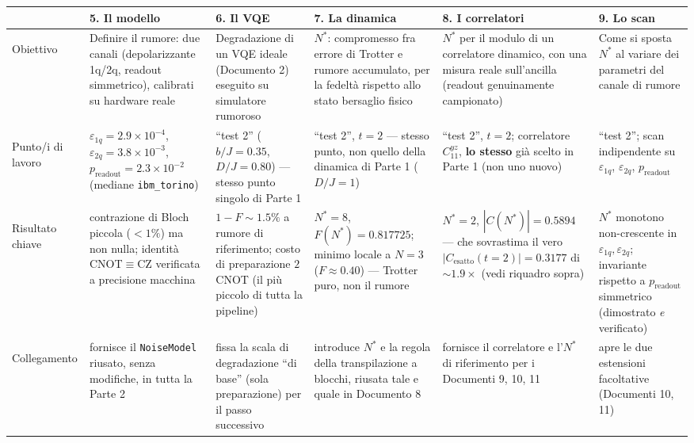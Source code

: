 \documentclass[11pt,a4paper]{article}
\begin{document}
\renewcommand{\arraystretch}{1.35}
\begin{landscape}
\thispagestyle{empty}
\begin{center}
\small
\setlength{\tabcolsep}{3.5pt}
\begin{tabular}{@{}>{\bfseries\raggedright}p{2.5cm} p{4.18cm} p{4.18cm} p{4.18cm} p{4.18cm} p{4.18cm}@{}}
\toprule
\rowcolor{grigetto}
 & \textbf{5. Il modello} & \textbf{6. Il VQE} & \textbf{7. La dinamica} & \textbf{8. I correlatori} & \textbf{9. Lo scan} \\
\midrule
Obiettivo &
Definire il rumore: due canali (depolarizzante 1q/2q, readout simmetrico),
calibrati su hardware reale &
Degradazione di un VQE ideale (Documento 2) eseguito su simulatore
rumoroso &
$N^*$: compromesso fra errore di Trotter e rumore accumulato, per la
fedeltà rispetto allo stato bersaglio fisico &
$N^*$ per il modulo di un correlatore dinamico, con una misura reale
sull'ancilla (readout genuinamente campionato) &
Come si sposta $N^*$ al variare dei parametri del canale di rumore \\
\addlinespace
Punto/i di lavoro &
$\varepsilon_{1q}=2.9\times10^{-4}$, $\varepsilon_{2q}=3.8\times10^{-3}$,
$p_\text{readout}=2.3\times10^{-2}$ (mediane \texttt{ibm\_torino}) &
``test 2'' ($b/J{=}0.35$, $D/J{=}0.80$) --- stesso punto singolo di
Parte 1 &
``test 2'', $t=2$ --- stesso punto, non quello della dinamica di Parte 1
($D/J=1$) &
``test 2'', $t=2$; correlatore $C_{11}^{yz}$, \textbf{lo stesso} già
scelto in Parte 1 (non uno nuovo) &
``test 2''; scan indipendente su $\varepsilon_{1q}$, $\varepsilon_{2q}$,
$p_\text{readout}$ \\
\addlinespace
Risultato chiave &
contrazione di Bloch piccola ($<1\%$) ma non nulla; identità
CNOT$\equiv$CZ verificata a precisione macchina &
$1-F\sim1.5\%$ a rumore di riferimento; costo di preparazione $2$ CNOT
(il più piccolo di tutta la pipeline) &
$N^*=8$, $F(N^*)=0.817725$; minimo locale a $N=3$ ($F\approx0.40$) ---
Trotter puro, non il rumore &
$N^*=2$, $|C(N^*)|=0.5894$ --- che sovrastima il vero
$|C_\text{esatto}(t{=}2)|=0.3177$ di $\sim1.9\times$ (vedi riquadro sopra)
&
$N^*$ monotono non-crescente in $\varepsilon_{1q},\varepsilon_{2q}$;
invariante rispetto a $p_\text{readout}$ simmetrico (dimostrato
\emph{e} verificato) \\
\addlinespace
Collegamento &
fornisce il \texttt{NoiseModel} riusato, senza modifiche, in tutta la
Parte 2 &
fissa la scala di degradazione ``di base'' (sola preparazione) per il
passo successivo &
introduce $N^*$ e la regola della transpilazione a blocchi, riusata tale
e quale in Documento 8 &
fornisce il correlatore e l'$N^*$ di riferimento per i Documenti 9, 10, 11
&
apre le due estensioni facoltative (Documenti 10, 11) \\
\bottomrule
\end{tabular}
\end{center}
\end{landscape}
\end{document}

